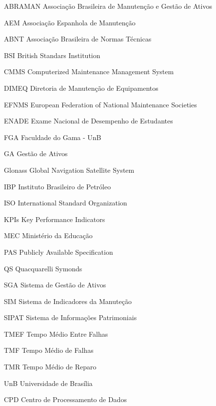 \begin{siglas}
  \item[ABRAMAN] Associação Brasileira de Manutenção e Gestão de Ativos
  \item[AEM] Associação Espanhola de Manutenção
  \item[ABNT] Associação Brasileira de Normas Técnicas
  \item[BSI] British Standars Institution
  \item[CMMS] Computerized Maintenance Management System
  \item[DIMEQ] Diretoria de Manutenção de Equipamentos
  \item[EFNMS] European Federation of National Maintenance Societies 
  \item[ENADE] Exame Nacional de Desempenho de Estudantes
  \item[FGA] Faculdade do Gama - UnB
  \item[GA] Gestão de Ativos
  \item[Glonass] Global Navigation Satellite System
  \item[IBP] Instituto Brasileiro de Petróleo
  \item[ISO] International Standard Organization
  \item[KPIs] Key Performance Indicators
  \item[MEC] Ministério da Educação
  \item[PAS] Publicly Available Specification
  \item[QS] Quacquarelli Symonds
  \item[SGA] Sistema de Gestão de Ativos
  \item[SIM] Sistema de Indicadores da Manuteção
  \item[SIPAT] Sistema de Informações Patrimoniais
  \item[TMEF] Tempo Médio Entre Falhas 
  \item[TMF] Tempo Médio de Falhas
  \item[TMR] Tempo Médio de Reparo  
  \item[UnB] Universidade de Brasília
  \item[CPD] Centro de Processamento de Dados
\end{siglas}